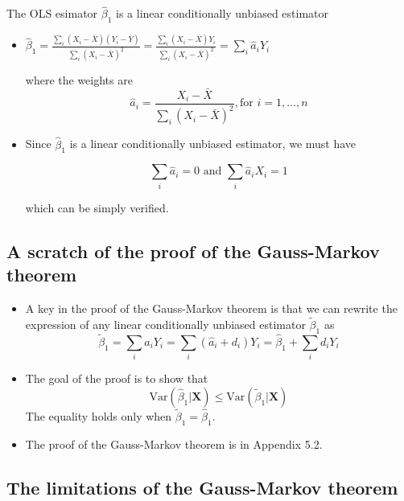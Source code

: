 \documentclass[presentation]{beamer}
\begin{document}
\begin{frame}[label={sec:orgc70bbc0}]{The OLS esimator \(\hat{\beta}_1\) is a linear conditionally unbiased estimator}
\begin{itemize}
\item \(\hat{\beta}_1 = \frac{\sum_i (X_i - \bar{X})(Y_i - \bar{Y})}{\sum_i
  (X_i - \bar{X})^2} = \frac{\sum_i (X_i - \bar{X})Y_i}{\sum_i (X_i -
  \bar{X})^2} = \sum_i \hat{a}_i Y_i\)

where the weights are
\[ \hat{a}_i = \frac{X_i - \bar{X}}{\sum_i (X_i - \bar{X})^2}, \text{
  for } i = 1, \ldots, n \]

\item Since \(\hat{\beta}_1\) is a linear conditionally unbiased estimator, we
must have

\[ \sum_i \hat{a}_i = 0 \text{ and } \sum_i \hat{a}_i X_i = 1  \]

which can be simply verified.
\end{itemize}
\end{frame}

\subsection*{A scratch of the proof of the Gauss-Markov theorem}
\label{sec:org0324fe3}

\begin{itemize}
\item A key in the proof of the Gauss-Markov theorem is that we can
rewrite the expression of any linear conditionally unbiased
estimator \(\tilde{\beta}_1\) as
\[ \tilde{\beta}_1 = \sum_i a_i Y_i = \sum_i (\hat{a}_i + d_i)Y_i =
  \hat{\beta}_1 + \sum_i d_i Y_i \]
\item The goal of
the proof is to show that
\[ \mathrm{Var}(\hat{\beta}_1 | \mathbf{X}) \leq \mathrm{Var}(\tilde{\beta}_1 |
  \mathbf{X}) \]
The equality holds only when \(\tilde{\beta}_1 = \hat{\beta}_1\).

\item The proof of the Gauss-Markov theorem is in Appendix 5.2.
\end{itemize}

\subsection*{The limitations of the Gauss-Markov theorem}
\label{sec:org938d375}
\end{document}
